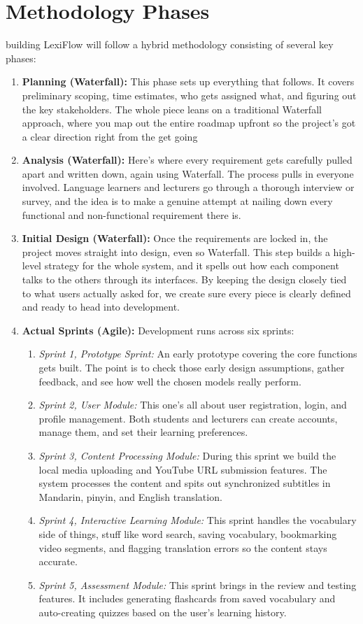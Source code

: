 \section{Methodology Phases}building LexiFlow will follow a hybrid methodology consisting of several key phases:
\begin{enumerate}[label= (\alph*)] \item \textbf{Planning (Waterfall):} This phase sets up everything that follows. It covers preliminary scoping, time estimates, who gets assigned what, and figuring out the key stakeholders. The whole piece leans on a traditional Waterfall approach, where you map out the entire roadmap upfront so the project's got a clear direction right from the get going \item \textbf{Analysis (Waterfall):} Here's where every requirement gets carefully pulled apart and written down, again using Waterfall. The process pulls in everyone involved. Language learners and lecturers go through a thorough interview or survey, and the idea is to make a genuine attempt at nailing down every functional and non-functional requirement there is. \item \textbf{Initial Design (Waterfall):} Once the requirements are locked in, the project moves straight into design, even so Waterfall. This step builds a high-level strategy for the whole system, and it spells out how each component talks to the others through its interfaces. By keeping the design closely tied to what users actually asked for, we create sure every piece is clearly defined and ready to head into development. \item \textbf{Actual Sprints (Agile):} Development runs across six sprints: \begin{enumerate}[label= (\roman*)] \item \textit{Sprint 1, Prototype Sprint:} An early prototype covering the core functions gets built. The point is to check those early design assumptions, gather feedback, and see how well the chosen models really perform. \item \textit{Sprint 2, User Module:} This one's all about user registration, login, and profile management. Both students and lecturers can create accounts, manage them, and set their learning preferences. \item \textit{Sprint 3, Content Processing Module:} During this sprint we build the local media uploading and YouTube URL submission features. The system processes the content and spits out synchronized subtitles in Mandarin, pinyin, and English translation. \item \textit{Sprint 4, Interactive Learning Module:} This sprint handles the vocabulary side of things, stuff like word search, saving vocabulary, bookmarking video segments, and flagging translation errors so the content stays accurate. \item \textit{Sprint 5, Assessment Module:} This sprint brings in the review and testing features. It includes generating flashcards from saved vocabulary and auto-creating quizzes based on the user's learning history.

\end{enumerate}
\end{enumerate}
